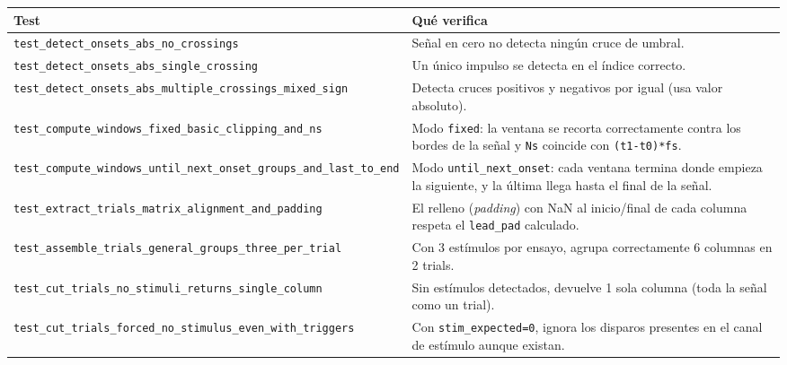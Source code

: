 \documentclass[11pt,a4paper]{article}
\begin{document}
\begin{center}
\begin{longtable}{L{6.3cm}L{8.2cm}}
\toprule
\textbf{Test} & \textbf{Qué verifica} \\
\midrule
\endhead
\texttt{test\_\allowbreak detect\_\allowbreak onsets\_\allowbreak abs\_\allowbreak no\_\allowbreak crossings} & Señal en cero no detecta ningún cruce de umbral. \\
\texttt{test\_\allowbreak detect\_\allowbreak onsets\_\allowbreak abs\_\allowbreak single\_\allowbreak crossing} & Un único impulso se detecta en el índice correcto. \\
\texttt{test\_\allowbreak detect\_\allowbreak onsets\_\allowbreak abs\_\allowbreak multiple\_\allowbreak crossings\_\allowbreak mixed\_\allowbreak sign} & Detecta cruces positivos y negativos por igual (usa valor absoluto). \\
\texttt{test\_\allowbreak compute\_\allowbreak windows\_\allowbreak fixed\_\allowbreak basic\_\allowbreak clipping\_\allowbreak and\_\allowbreak ns} & Modo \texttt{fixed}: la ventana se recorta correctamente contra los bordes de la señal y \texttt{Ns} coincide con \texttt{(t1-t0)*fs}. \\
\texttt{test\_\allowbreak compute\_\allowbreak windows\_\allowbreak until\_\allowbreak next\_\allowbreak onset\_\allowbreak groups\_\allowbreak and\_\allowbreak last\_\allowbreak to\_\allowbreak end} & Modo \texttt{until\_\allowbreak next\_\allowbreak onset}: cada ventana termina donde empieza la siguiente, y la última llega hasta el final de la señal. \\
\texttt{test\_\allowbreak extract\_\allowbreak trials\_\allowbreak matrix\_\allowbreak alignment\_\allowbreak and\_\allowbreak padding} & El relleno (\textit{padding}) con NaN al inicio/final de cada columna respeta el \texttt{lead\_\allowbreak pad} calculado. \\
\texttt{test\_\allowbreak assemble\_\allowbreak trials\_\allowbreak general\_\allowbreak groups\_\allowbreak three\_\allowbreak per\_\allowbreak trial} & Con 3 estímulos por ensayo, agrupa correctamente 6 columnas en 2 trials. \\
\texttt{test\_\allowbreak cut\_\allowbreak trials\_\allowbreak no\_\allowbreak stimuli\_\allowbreak returns\_\allowbreak single\_\allowbreak column} & Sin estímulos detectados, devuelve 1 sola columna (toda la señal como un trial). \\
\texttt{test\_\allowbreak cut\_\allowbreak trials\_\allowbreak forced\_\allowbreak no\_\allowbreak stimulus\_\allowbreak even\_\allowbreak with\_\allowbreak triggers} & Con \texttt{stim\_\allowbreak expected=0}, ignora los disparos presentes en el canal de estímulo aunque existan. \\

\end{longtable}
\end{center}
\end{document}
